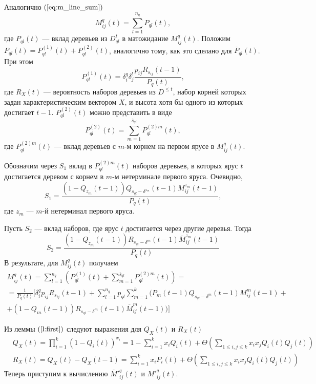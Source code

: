 \documentclass[12pt]{article}
\renewcommand{\leq}{\leqslant}
\begin{document}
{Аналогично $(\ref{eq:m_line_sum})$
\begin{equation*}
	M^q_{ij}(t) = \sum_{l = 1}^{n_q} P_{ql}(t),
\end{equation*}
где $P_{ql}(t)$ --- вклад деревьев из $D^t_{ql}$ в матожидание $M^q_{ij}(t)$. Положим $P_{ql}(t) = P^{(1)}_{ql}(t) + P^{(2)}_{ql}(t)$, аналогично тому, как это сделано для $\overline{P}_{ql}(t)$. При этом
\begin{equation*}
	P^{(1)}_{ql}(t) = \delta^q_i \delta^l_j \frac{p_{ij} R_{s_{ij}}(t - 1)}{P_q(t)},
\end{equation*}
где $R_X(t)$ --- вероятность наборов деревьев из $D^{\leq t}$, набор корней которых задан характеристическим вектором $X$, и высота хотя бы одного из которых достигает $t - 1$. $P^{(2)}_{ql}(t)$ можно представить в виде
\begin{equation*}
	P^{(2)}_{ql}(t) = \sum_{m = 1}^{\overline{s}_{ql}} P^{(2)m}_{ql}(t),
\end{equation*}
где $P^{(2)m}_{ql}(t)$ --- вклад деревьев с $m$-м корнем на первом ярусе в $M^q_{ij}(t)$.

Обозначим через $S_1$ вклад в $P^{(2)m}_{ql}(t)$ наборов деревьев, в которых ярус $t$ достигается деревом с корнем в $m$-м нетерминале первого яруса. Очевидно,
\begin{equation*}
	S_1 = \frac{(1 - Q_{z_m}(t-1)) Q_{s_{ql} - \delta^{z_m}}(t - 1) M^{z_m}_{ij}(t - 1)}{P_q(t)},
\end{equation*}
где $z_m$ --- $m$-й нетерминал первого яруса.

Пусть $S_2$ --- вклад наборов, где ярус $t$ достигается через другие деревья. Тогда
\begin{equation*}
	S_2 = \frac{(1 - Q_{z_m}(t - 1)) R_{s_{ql} - \delta^m}(t - 1) \overline{M}^{z_m}_{ij}(t - 1)}{P_q(t)}
\end{equation*}
В результате, для $M^q_{ij}(t)$ получаем
\begin{multline*}
	M^q_{ij}(t) = \sum_{l = 1}^{n_q} \left( P^{(1)}_{ql}(t) + \sum_{m = 1}^{\overline{s}_{ql}} P^{(2)m}_{ql}(t) \right) = \\
	= \frac{1}{P_q(t)} [ \delta^q_i p_{ij} R_{s_{ij}}(t - 1) + \sum_{l = 1}^{n_q} p_{ql} \sum_{m = 1}^k (P_m(t - 1) Q_{s_{ql} - \delta^m}(t - 1) M^m_{ij}(t - 1) + \\
	+ (1 - Q_m(t - 1)) R_{s_{ql} - \delta^m}(t - 1) \overline{M}^m_{ij}(t - 1)) ]
\end{multline*}

Из леммы $(\ref{l:first})$ следуют выражения для $Q_X(t)$ и $R_X(t)$
\begin{equation}
\label{eq:qx_rx}
	\begin{split}
		&Q_X(t) = \prod_{i = 1}^k (1 - Q_i(t))^{x_i} = 1 - \sum_{i = 1}^k x_i Q_i(t) + \Theta \left( \sum_{1 \leq i,j \leq k} x_i x_j Q_i(t) Q_j(t) \right) \\
		&R_X(t) = Q_X(t) - Q_X(t - 1) = \sum_{i = 1}^k x_i P_i(t) + \Theta \left( \sum_{1 \leq i,j \leq k} x_i x_j Q_i(t) Q_j(t) \right)
	\end{split}
\end{equation}
Теперь приступим к вычислению $\overline{M}'^q_{ij}(t)$ и $M'^q_{ij}(t)$.

}
\end{document}
